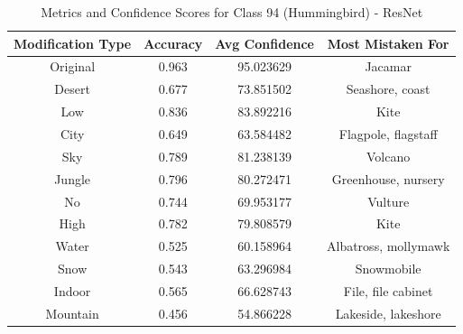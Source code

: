 \begin{table}
	\centering
	\begin{tabular}{|c|c|c|c|}
		\hline
		\textbf{Modification Type} & \textbf{Accuracy} & \textbf{Avg Confidence} & \textbf{Most Mistaken For} \\
		\hline
		Original & 0.963 & 95.023629 & Jacamar \\
		\hline
		Desert & 0.677 & 73.851502 & Seashore, coast \\
		\hline
		Low & 0.836 & 83.892216 & Kite \\
		\hline
		City & 0.649 & 63.584482 & Flagpole, flagstaff \\
		\hline
		Sky & 0.789 & 81.238139 & Volcano \\
		\hline
		Jungle & 0.796 & 80.272471 & Greenhouse, nursery \\
		\hline
		No & 0.744 & 69.953177 & Vulture \\
		\hline
		High & 0.782 & 79.808579 & Kite \\
		\hline
		Water & 0.525 & 60.158964 & Albatross, mollymawk \\
		\hline
		Snow & 0.543 & 63.296984 & Snowmobile \\
		\hline
		Indoor & 0.565 & 66.628743 & File, file cabinet \\
		\hline
		Mountain & 0.456 & 54.866228 & Lakeside, lakeshore \\
		\hline
	\end{tabular}
	\caption{Metrics and Confidence Scores for Class 94 (Hummingbird) - ResNet}
	\label{tab:metrics_confidence_class_94_resnet}
\end{table}

